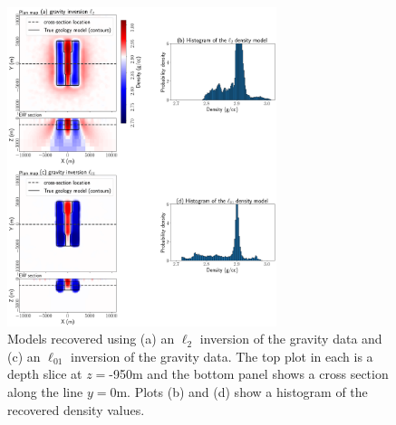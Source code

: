 \begin{figure}[!htb]
    \begin{center}
    \includegraphics[width=0.7\textwidth]{figures/gravity_l22_lpq.png}
    \end{center}
\caption{
    Models recovered using (a) an $\ell_2$ inversion of the gravity data and (c) an $\ell_{01}$ inversion of the gravity data. The top plot in each is a depth slice at $z=$-950m and the bottom panel shows a cross section along the line $y=0$m. Plots (b) and (d) show a histogram of the recovered density values.
}
\label{fig:gravity-inversion}
\end{figure}

